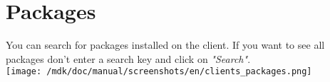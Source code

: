 \section{Packages}You can search for packages installed on the client. If you want to see all packages don't enter a search key and click on \textit{"Search"}.\\
\texttt{[image: /mdk/doc/manual/screenshots/en/clients\_packages.png]} \\
